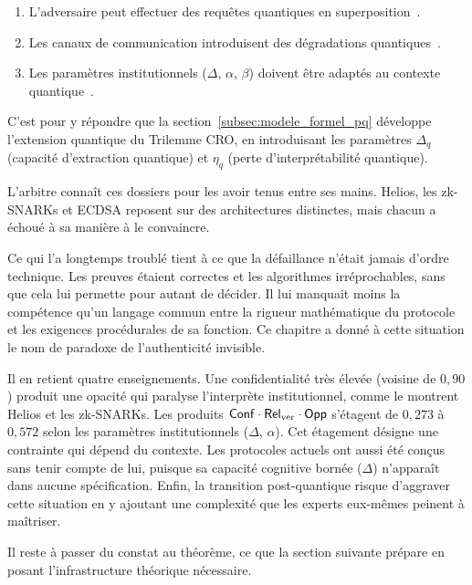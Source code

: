 \begin{sloppypar}
\begin{enumerate}
\item L'adversaire peut effectuer des requ\^etes quantiques en superposition~\cite{Watrous2009,Boneh2011}.
\item Les canaux de communication introduisent des d\'egradations quantiques~\cite{Holevo1973,Schumacher1997}.
\item Les param\`etres institutionnels ($\Delta$, $\alpha$, $\beta$) doivent
\^etre adapt\'es au contexte quantique~\cite{Mayers1997,Lo1997}.
\end{enumerate}

C'est pour y r\'epondre que la section~\ref{subsec:modele_formel_pq} d\'eveloppe
l'extension quantique du Trilemme CRO, en introduisant les param\`etres
$\Delta_q$ (capacit\'e d'extraction quantique) et $\eta_q$ (perte d'interpr\'etabilit\'e
quantique).

\end{sloppypar}


\begin{boiteArbitre}
L'arbitre conna\^it ces dossiers pour les avoir tenus entre ses mains.
Helios, les zk-SNARKs et ECDSA reposent sur des architectures distinctes,
mais chacun a \'echou\'e \`a sa mani\`ere \`a le convaincre.

Ce qui l'a longtemps troubl\'e tient \`a ce que la d\'efaillance n'\'etait jamais
d'ordre technique. Les preuves \'etaient correctes et les algorithmes
irr\'eprochables, sans que cela lui permette pour autant de d\'ecider. Il lui
manquait moins la comp\'etence qu'un langage commun entre la rigueur
math\'ematique du protocole et les exigences proc\'edurales de sa fonction. Ce
chapitre a donn\'e \`a cette situation le nom de paradoxe de l'authenticit\'e
invisible.

Il en retient quatre enseignements. Une confidentialit\'e tr\`es \'elev\'ee
(voisine de $0{,}90$) produit une opacit\'e qui paralyse l'interpr\`ete
institutionnel, comme le montrent Helios et les zk-SNARKs. Les
produits $\mathsf{Conf} \cdot \mathsf{Rel}_{\mathrm{ver}} \cdot \mathsf{Opp}$ s'\'etagent de $0{,}273$ \`a $0{,}572$
selon les param\`etres institutionnels ($\Delta$, $\alpha$). Cet \'etagement
d\'esigne une contrainte qui d\'epend du contexte.
Les protocoles actuels ont aussi \'et\'e con\c{c}us sans tenir compte de
lui, puisque sa capacit\'e cognitive born\'ee ($\Delta$) n'appara\^it dans aucune
sp\'ecification. Enfin, la transition post-quantique risque d'aggraver cette
situation en y ajoutant une complexit\'e que les experts eux-m\^emes peinent \`a
ma\^itriser.

Il reste \`a passer du constat au th\'eor\`eme, ce que la section suivante
pr\'epare en posant l'infrastructure th\'eorique n\'ecessaire.
\end{boiteArbitre}